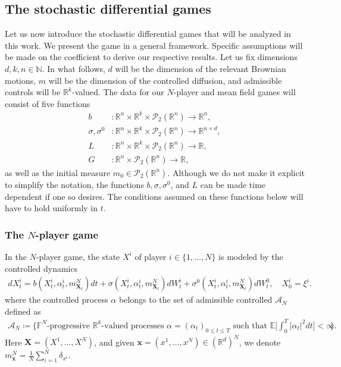 \documentclass[11pt,reqno]{amsart}
\numberwithin{equation}{section}
\theoremstyle{definition}
\def\E{{\mathbb E}}
\def\R{{\mathbb R}}
\def\N{{\mathbb N}}
\newcommand{\sP}{\mathcal{P}}
\newcommand{\bx}{\mathbf{x}}
\newcommand{\bX}{\mathbf{X}}
\newcommand{\spt}{\mathcal{P}_2(\R^n)}
\newcommand{\sA}{\mathcal{A}}
\newcommand{\bbF}{\mathbb{F}}
\newcommand\cA{\mathcal A}
\def \E{\mathbb{E}}
\def \N{\mathbb{N}}
\def \R{\mathbb{R}}
\begin{document}
\subsection{The stochastic differential games}
\label{subsec:gamesetup}
Let us now introduce the stochastic differential games that will be analyzed in this work.
We present the game in a general framework.
Specific assumptions will be made on the coefficient to derive our respective results.
Let us fix dimensions $d,k,n \in \N$. In what follows, $d$ will be the dimension of the relevant Brownian motions, $m$ will be the dimension of the controlled diffusion, and admissible controls will be $\R^k$-valued. The data for our $N$-player and mean field games will consist of five functions
\begin{align*}
b &: \R^n \times \R^k \times \spt \to \R^n, \\
\sigma, \sigma^0 &: \R^n \times \R^k \times \spt \to \R^{n \times d}, \\
L &: \R^n \times \R^k \times \spt \to \R, \\
 G &: \R^n \times \spt \to \R, 
\end{align*}
as well as the initial measure $m_0 \in \sP_2(\R^n)$.
Although we do not make it explicit to simplify the notation, the functions $b,\sigma,\sigma^0$, and $L$ can be made time dependent if one so desires.
The conditions assumed on these functions below will have to hold uniformly in $t$.



\subsubsection{The $N$-player game}
In the $N$-player game, the state $X^i$ of player $i \in \{1,\dots,N\}$ is modeled by the controlled dynamics
\begin{align} \label{xdynamics}
  dX_t^i = b(X_t^i, \alpha_t^i, m_{\bX_t}^N) dt + \sigma(X_t^i, \alpha_t^i, m_{\bX_t}^N) dW_t^i + \sigma^0(X_t^i, \alpha_t^i, m_{\bX_t}^N) dW_t^0, \quad 
X_0^i = \xi^i. 
\end{align}
where the controlled process $\alpha$ belongs to the set of admissible controlled $\cA_N$ defined as
\begin{align} \label{def:an}
  \sA_N \coloneqq \bigg\{\text{$\bbF^N$-progressive $\R^k$-valued processes $\alpha = (\alpha_t)_{0 \leq t \leq T}$ such that $\E\Big[\int_0^T |\alpha_t|^2 dt\Big] < \infty$ } \bigg\}.
\end{align}
Here $\bX = (X^1,\dots,X^N)$, and given $\bx = (x^1,\dots,x^N) \in (\R^d)^N$, we denote $m_{\bx}^N = \frac{1}{N} \sum_{i = 1}^N \delta_{x^i}$.
\end{document}
